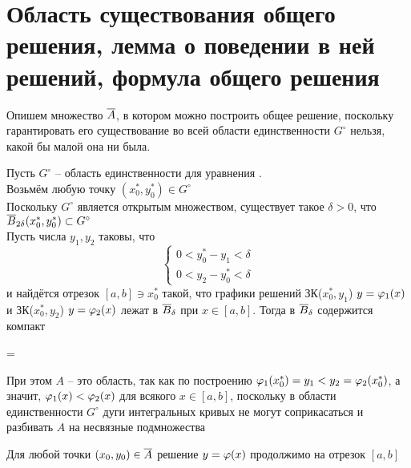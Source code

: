 \section{Область существования общего решения, лемма о поведении в ней решений, формула общего решения}

Опишем множество $ \overline A $, в котором можно построить общее решение, поскольку гарантировать его существование во всей области единственности $ G^\circ $ нельзя, какой бы малой она ни была.

\begin{algorithm}[построения $ \ol{A} $]
    Пусть $ G^\circ $ -- область единственности для уравнения . \\
    Возьмём любую точку $ (x_0^*, y_0^*) \in G^\circ $ \\
    Поскольку $ G^\circ $ является открытым множеством, существует такое $ \delta > 0 $, что $ \overline{B}_{2\delta}(x_0^*, y_0^*) \subset G^\circ $ \\
    Пусть числа $ y_1, y_2 $ таковы, что
    $$
    \begin{cases}
    	0 < y_0^* - y_1 < \delta \\
        0 < y_2 - y_0^* < \delta
    \end{cases} $$
    и найдётся отрезок $ [a, b] \ni x_0^* $ такой, что графики решений ЗК($ x_0^*, y_1 $) $ y = \varphi_1(x) $ и ЗК($ x_0^*, y_2 $) $ y = \varphi_2(x) $ лежат в $ \overline{B}_\delta $ при $ x \in [a, b] $. Тогда в $ \overline{B}_\delta $ содержится компакт
    \begin{equ}{1.25}
         = 
    \end{equ}
\end{algorithm}

При этом $ A $ -- это область, так как по построению $ \varphi_1(x_0^*) = y_1 < y_2 = \varphi_2(x_0^*) $, а значит, $ \varphi_1(x) < \varphi_2(x) $ для всякого $ x \in [a, b] $, поскольку в области единственности $ G^\circ $ дуги интегральных кривых не могут соприкасаться и разбивать $ A $ на несвязные подмножества

\begin{lemma}\label{lm:comp}
    Для любой точки $ (x_0, y_0) \in \overline{A} $ решение  $ y = \varphi(x) $ продолжимо на отрезок $ [a, b] $
\end{lemma}

